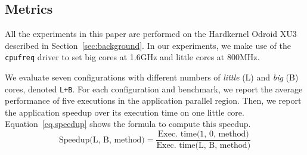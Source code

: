 





\subsection{Metrics}
\label{sec:metrics}

All the experiments in this paper are performed on the Hardkernel Odroid XU3 described in Section~\ref{sec:background}. In our experiments, we make use of the \texttt{cpufreq} driver to set big cores at 1.6GHz and little cores at 800MHz. 

We evaluate seven configurations with different numbers of \textit{little} (L) and \textit{big} (B) cores, denoted \texttt{L+B}.
For each configuration and benchmark, we report the average performance of five executions in the application parallel region. Then, we report the application speedup over its execution time on one little core.
Equation~\ref{eq.speedup} shows the formula to compute this speedup.
\begingroup\makeatletter\def\f@size{9}\check@mathfonts
\begin{equation}
  \text{Speedup(L, B, method)} = \frac{\text{Exec. time(1, 0, method)}}{\text{Exec. time(L, B, 
method)}}
\label{eq.speedup}
\end{equation}
\endgroup


